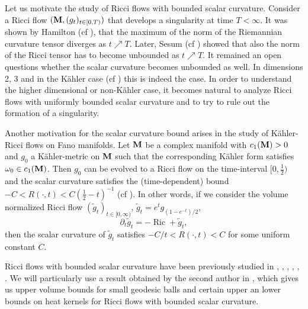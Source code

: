 \documentclass[11pt]{amsart}
\numberwithin{equation}{section}
\def\M{{\bf M}}
\DeclareMathOperator{\Ric}{Ric}
\numberwithin{equation}{section}
\begin{document}
Let us motivate the study of Ricci flows with bounded scalar curvature.
Consider a Ricci flow $(\M, (g_t)_{t \in [0,T)})$ that develops a singularity at time $T < \infty$.
It was shown by Hamilton (cf \cite{Ha:0}), that the maximum of the norm of the Riemannian curvature tensor diverges as $t \nearrow T$.
Later, Sesum (cf \cite{Sesum-Ricci}) showed that also the norm of the Ricci tensor has to become unbounded as $t \nearrow T$.
It remained an open questions whether the scalar curvature becomes unbounded as well.
In dimensions 2, 3 and in the K\"ahler case (cf \cite{ZhouZhang-scal}) this is indeed the case.
In order to understand the higher dimensional or non-K\"ahler case, it becomes natural to analyze Ricci flows with uniformly bounded scalar curvature and to try to rule out the formation of a singularity.

Another motivation for the scalar curvature bound arises in the study of K\"ahler-Ricci flows on Fano manifolds.
Let $\M$ be a complex manifold with $c_1 ( \M ) > 0$ and $g_0$ a K\"ahler-metric on $\M$ such that the corresponding K\"ahler form satisfies $\omega_0 \in c_1 ( \M)$.
Then $g_0$ can be evolved to a Ricci flow on the time-interval $[0,\frac12)$ and the scalar curvature satisfies the (time-dependent) bound $- C < R( \cdot, t) < C (\frac12 - t)^{-1}$ (cf \cite{ST:1}).
In other words, if we consider the volume normalized Ricci flow $(\widetilde{g}_t )_{t \in [0, \infty)}$, $\widetilde{g}_t = e^{t} g_{ (1- e^{-t}) / 2}$,
\[ \partial_t \widetilde{g}_t = - \Ric + \widetilde{g}_t, \]
then the scalar curvature of $\widetilde{g}_t$ satisfies $- C/t < R (\cdot, t) < C$ for some uniform constant $C$.

Ricci flows with bounded scalar curvature have been previously studied in \cite{CH:2}, \cite{CW:1}, \cite{CW:2}, \cite{CW:3}, \cite{Wa:1}, \cite{Z11:1}.
We will particularly use a result obtained by the second author in \cite{Z11:1}, which gives us upper volume bounds for small geodesic balls and certain upper an lower bounds on heat kernels for Ricci flows with bounded scalar curvature.
\end{document}
